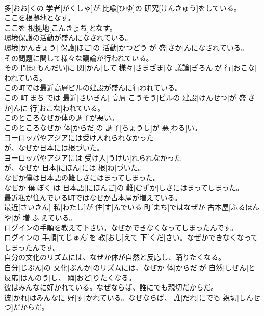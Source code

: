 \documentclass[8pt]{extreport}
\begin{document}
\begin{CJK}{UTF8}{min}
\\	多[おお]くの 学者[がくしゃ]が 比喩[ひゆ]の 研究[けんきゅう]をしている。
\\	ここを根拠地となす。	
\\	ここを 根拠地[こんきょち]となす。
\\	環境保護の活動が盛んになされている。	
\\	環境[かんきょう] 保護[ほご]の 活動[かつどう]が 盛[さか]んになされている。
\\	その問題に関して様々な議論が行われている。	
\\	その 問題[もんだい]に 関[かん]して 様々[さまざま]な 議論[ぎろん]が 行[おこな]われている。
\\	この町では最近高層ビルの建設が盛んに行われている。	
\\	この 町[まち]では 最近[さいきん] 高層[こうそう]ビルの 建設[けんせつ]が 盛[さか]んに 行[おこな]われている。
\\	このところなぜか体の調子が悪い。	
\\	このところなぜか 体[からだ]の 調子[ちょうし]が 悪[わる]い。
\\	ヨーロッパやアジアには受け入れられなかった
\\	が、なぜか日本には根づいた。	
\\	ヨーロッパやアジアには 受け入[うけい]れられなかった 
\\	が、なぜか 日本[にほん]には 根[ね]づいた。
\\	なぜか僕は日本語の難しさにはまってしまった。	
\\	なぜか 僕[ぼく]は 日本語[にほんご]の 難[むずか]しさにはまってしまった。
\\	最近私が住んでいる町ではなぜか古本屋が増えている。	
\\	最近[さいきん] 私[わたし]が 住[す]んでいる 町[まち]ではなぜか 古本屋[ふるほんや]が 増[ふ]えている。
\\	ログインの手順を教えて下さい。なぜかできなくなってしまったんです。	
\\	ログインの 手順[てじゅん]を 教[おし]えて 下[くだ]さい。なぜかできなくなってしまったんです。
\\	自分の文化のリズムには、なぜか体が自然と反応し、踊りたくなる。	
\\	自分[じぶん]の 文化[ぶんか]のリズムには、なぜか 体[からだ]が 自然[しぜん]と 反応[はんのう]し、 踊[おど]りたくなる。
\\	彼はみんなに好かれている。なぜならば、誰にでも親切だからだ。	
\\	彼[かれ]はみんなに 好[す]かれている。なぜならば、 誰[だれ]にでも 親切[しんせつ]だからだ。

\end{CJK}
\end{document}
